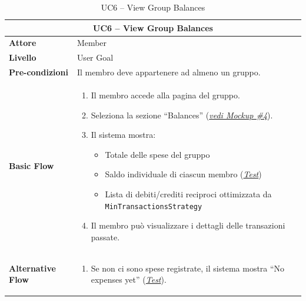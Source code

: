 \begin{table}[htbp]
    \centering
    \footnotesize
    \begin{tabularx}{\textwidth}{|l|X|}
        \hline
        \multicolumn{2}{|c|}{\textbf{UC6 -- View Group Balances}} \\
        \hline
        \textbf{Attore} & Member \\
        \hline
        \textbf{Livello} & User Goal \\
        \hline
        \textbf{Pre-condizioni} & Il membro deve appartenere ad almeno un gruppo. \\
        \hline
        \textbf{Basic Flow} & 
        \begin{enumerate}[leftmargin=*, nosep, topsep=3pt]
            \item Il membro accede alla pagina del gruppo.
            \item Seleziona la sezione ``Balances'' (\hyperref[fig:balances]{\textit{vedi Mockup \#4}}).
            \item Il sistema mostra:
            \begin{itemize}[nosep, label={--}, topsep=2pt]
                \item Totale delle spese del gruppo
                \item Saldo individuale di ciascun membro (\hyperref[test:uc6_balances]{\textit{Test}})
                \item Lista di debiti/crediti reciproci ottimizzata da \texttt{MinTransactionsStrategy}
            \end{itemize}
            \item Il membro può visualizzare i dettagli delle transazioni passate.
        \end{enumerate} \\
        \hline
        \textbf{Alternative Flow} & 
        \begin{enumerate}[label=3\alph*., leftmargin=*, nosep, topsep=3pt]
            \item Se non ci sono spese registrate, il sistema mostra ``No expenses yet'' (\hyperref[test:uc6_settled]{\textit{Test}}).
        \end{enumerate} \\
        \hline
    \end{tabularx}
    \caption{UC6 -- View Group Balances}
    \label{tab:uc6}
\end{table}


